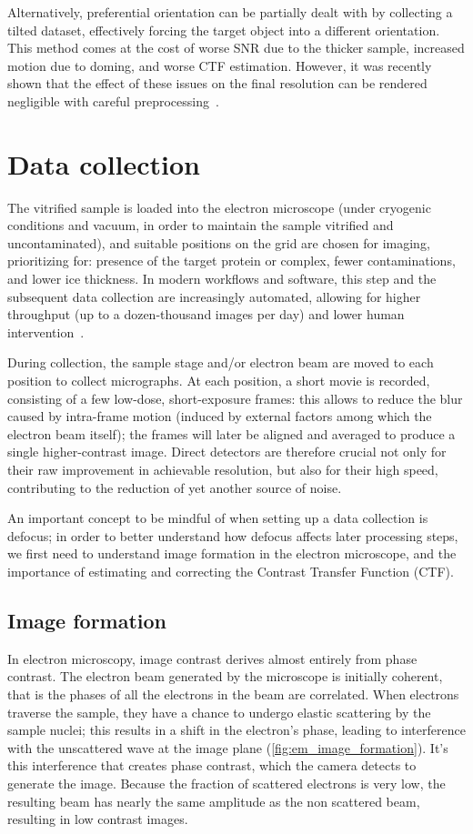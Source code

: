 Alternatively, preferential orientation can be partially dealt with by collecting a tilted dataset, effectively forcing the target object into a different orientation.
This method comes at the cost of worse SNR due to the thicker sample, increased motion due to doming, and worse CTF estimation.
However, it was recently shown that the effect of these issues on the final resolution can be rendered negligible with careful preprocessing~\cite{aiyerOvercomingResolutionAttenuation2024}.

\section{Data collection}
The vitrified sample is loaded into the electron microscope (under cryogenic conditions and vacuum, in order to maintain the sample vitrified and uncontaminated), and suitable positions on the grid are chosen for imaging, prioritizing for: presence of the target protein or complex, fewer contaminations, and lower ice thickness.
In modern workflows and software, this step and the subsequent data collection are increasingly automated, allowing for higher throughput (up to a dozen-thousand images per day) and lower human intervention~\cite{schorbSoftwareToolsAutomated2019}.

During collection, the sample stage and/or electron beam are moved to each position to collect micrographs.
At each position, a short movie is recorded, consisting of a few low-dose, short-exposure frames: this allows to reduce the blur caused by intra-frame motion (induced by external factors among which the electron beam itself); the frames will later be aligned and averaged to produce a single higher-contrast image.
Direct detectors are therefore crucial not only for their raw improvement in achievable resolution, but also for their high speed, contributing to the reduction of yet another source of noise.

An important concept to be mindful of when setting up a data collection is defocus; in order to better understand how defocus affects later processing steps, we first need to understand image formation in the electron microscope, and the importance of estimating and correcting the Contrast Transfer Function (CTF).

\subsection{Image formation}

In electron microscopy, image contrast derives almost entirely from phase contrast.
The electron beam generated by the microscope is initially coherent, that is the phases of all the electrons in the beam are correlated.
When electrons traverse the sample, they have a chance to undergo elastic scattering by the sample nuclei; this results in a shift in the electron's phase, leading to interference with the unscattered wave at the image plane (\autoref{fig:em_image_formation}).
It's this interference that creates phase contrast, which the camera detects to generate the image.
Because the fraction of scattered electrons is very low, the resulting beam has nearly the same amplitude as the non scattered beam, resulting in low contrast images.


